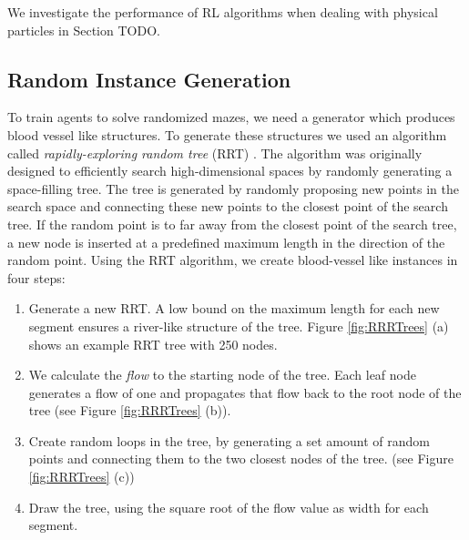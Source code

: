 We investigate the performance of RL algorithms when dealing with physical particles in Section TODO.

\subsection{Random Instance Generation} \label{sec:RandomInstanceGeneration}
To train agents to solve randomized mazes, we need a generator which produces blood vessel like structures. To generate these structures we used an algorithm called \textit{rapidly-exploring random tree} (RRT) \cite{lavalle1998rapidly}. The algorithm was originally designed to efficiently search high-dimensional spaces by randomly generating a space-filling tree. The tree is generated by randomly proposing new points in the search space and connecting these new points to the closest point of the search tree. If the random point is to far away from the closest point of the search tree, a new node is inserted at a predefined maximum length in the direction of the random point. Using the RRT algorithm, we create blood-vessel like instances in four steps:

\begin{enumerate}
    \item Generate a new RRT. A low bound on the maximum length for each new segment ensures a river-like structure of the tree. Figure \ref{fig:RRRTrees} (a) shows an example RRT tree with 250 nodes.
    \item We calculate the \textit{flow} to the starting node of the tree. Each leaf node generates a flow of one and propagates that flow back to the root node of the tree (see Figure \ref{fig:RRRTrees} (b)).
    \item Create random loops in the tree, by generating a set amount of random points and connecting them to the two closest nodes of the tree. (see Figure \ref{fig:RRRTrees} (c))
    \item Draw the tree, using the square root of the flow value as width for each segment.
\end{enumerate}

